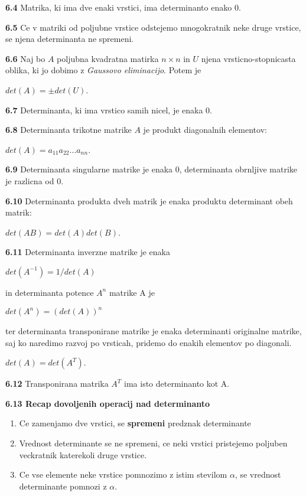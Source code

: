 \documentclass{article}
\begin{document}
\begin{multicols}{4}
	\textbf{6.4} Matrika, ki ima dve enaki vrstici, ima determinanto enako 0.

	\textbf{6.5} Ce v matriki od poljubne vrstice odstejemo mnogokratnik neke druge vrstice,
	se njena determinanta ne spremeni.

	\textbf{6.6} Naj bo $A$ poljubna kvadratna matirka $n \times n$ in $U$ njena vrsticno-stopnicasta
	oblika, ki jo dobimo z \textit{Gaussovo eliminacijo}. Potem je
	\begin{center}
		$det(A) = \pm det(U)$.
	\end{center}

	\textbf{6.7} Determinanta, ki ima vrstico samih nicel, je enaka 0.

	\textbf{6.8} Determinanta trikotne matrike $A$ je produkt diagonalnih elementov:
	\begin{center}
		$det(A) = a_{11}a_{22} \hdots a_{nn}$.
	\end{center}

	\textbf{6.9} Determinanta singularne matrike je enaka 0, determinanta obrnljive matrike je razlicna od 0.

	\textbf{6.10} Determinanta produkta dveh matrik je enaka produktu determinant obeh matrik:
	\begin{center}
		$det(AB) = det(A)det(B)$.
	\end{center}

	\textbf{6.11} Determinanta inverzne matrike je enaka
	\begin{center}
		$det(A^{-1}) = 1/det(A)$
	\end{center}
	in determinanta potence $A^{n}$ matrike A je
	\begin{center}
		$det(A^{n}) = (det(A))^{n}$
	\end{center}
	ter determinanta transponirane matrike je enaka determinanti originalne matrike,
	saj ko naredimo razvoj po vrsticah, pridemo do enakih elementov po diagonali.
	\begin{center}
		$det(A) = det(A^{T})$.
	\end{center}

	\textbf{6.12} Transponirana matrika $A^{T}$ ima isto determinanto kot A.

	\textbf{6.13 Recap dovoljenih operacij nad determinanto}
	\begin{enumerate}
		\item Ce zamenjamo dve vrstici, se \textbf{spremeni} predznak determinante
		\item Vrednost determinante se ne spremeni, ce neki vrstici pristejemo poljuben veckratnik katerekoli druge vrstice.
		\item Ce vse elemente neke vrstice pomnozimo z istim stevilom $\alpha$, se vrednost determinante pomnozi z $\alpha$.
	\end{enumerate}


\end{multicols}
\end{document}
